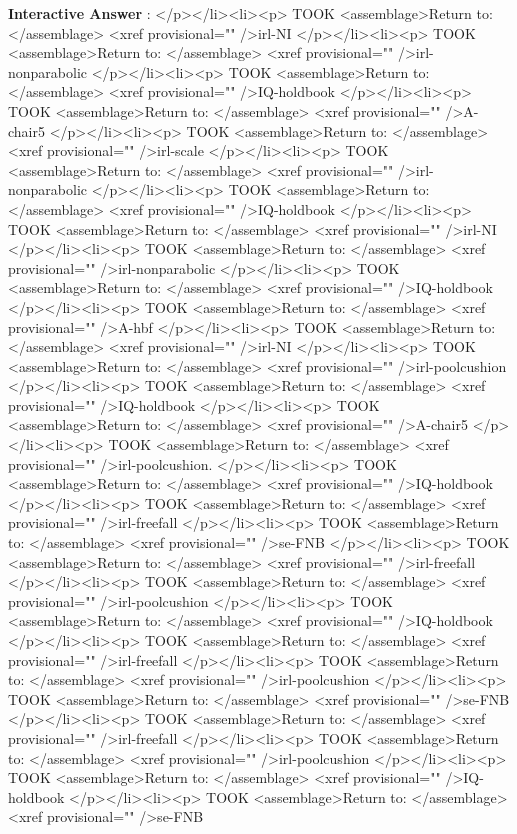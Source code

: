 \documentclass[11pt,letter,openany,makeidx]{book}
\newcounter{AtIQ}
\renewcommand{\theAtIQ}{Answer \arabic{AtIQ}}
\newenvironment{AIQ}{\begin{list}{\textbf{Interactive \theAtIQ}:}{\usecounter{AtIQ} \leftmargin 12pt}}{\end{list}}
\begin{document}
\begin{AIQ}
</p></li><li><p>\label{A-chair6} TOOK <assemblage>Return to: </assemblage> <xref provisional="" />{irl-NI}
</p></li><li><p>\label{A-fly.balls} TOOK <assemblage>Return to: </assemblage> <xref provisional="" />{irl-nonparabolic}
</p></li><li><p>\label{A-hitY} TOOK  <assemblage>Return to: </assemblage> <xref provisional="" />{IQ-holdbook}
</p></li><li><p>\label{A-noFT} TOOK <assemblage>Return to: </assemblage> <xref provisional="" />{A-chair5}
</p></li><li><p>\label{A-scale.ramp} TOOK   <assemblage>Return to: </assemblage> <xref provisional="" />{irl-scale}
</p></li><li><p>\label{A-pitches.side} TOOK  <assemblage>Return to: </assemblage> <xref provisional="" />{irl-nonparabolic}
</p></li><li><p>\label{A-hitN} TOOK <assemblage>Return to: </assemblage> <xref provisional="" />{IQ-holdbook}
</p></li><li><p>\label{A-chair7} TOOK <assemblage>Return to: </assemblage> <xref provisional="" />{irl-NI}
</p></li><li><p>\label{A-pitches.top} TOOK <assemblage>Return to: </assemblage> <xref provisional="" />{irl-nonparabolic}
</p></li><li><p>\label{A-landedY} TOOK  <assemblage>Return to: </assemblage> <xref provisional="" />{IQ-holdbook}
</p></li><li><p>\label{A-gravity}  TOOK <assemblage>Return to: </assemblage> <xref provisional="" />{A-hbf}
</p></li><li><p>\label{A-chair8} TOOK <assemblage>Return to: </assemblage> <xref provisional="" />{irl-NI}
</p></li><li><p>\label{A-pool-roll} TOOK <assemblage>Return to: </assemblage> <xref provisional="" />{irl-poolcushion}
</p></li><li><p>\label{A-landedN} TOOK <assemblage>Return to: </assemblage> <xref provisional="" />{IQ-holdbook}
</p></li><li><p>\label{A-FT} TOOK  <assemblage>Return to: </assemblage> <xref provisional="" />{A-chair5}
</p></li><li><p>\label{A-pool-bumper} TOOK <assemblage>Return to: </assemblage> <xref provisional="" />{irl-poolcushion}.
</p></li><li><p>\label{A-zero} TOOK <assemblage>Return to: </assemblage> <xref provisional="" />{IQ-holdbook}
</p></li><li><p>\label{A-firstfall} TOOK  <assemblage>Return to: </assemblage> <xref provisional="" />{irl-freefall}
</p></li><li><p>\label{A-floor}  TOOK  <assemblage>Return to: </assemblage> <xref provisional="" />{se-FNB}
</p></li><li><p>\label{A-firstwhy} TOOK  <assemblage>Return to: </assemblage> <xref provisional="" />{irl-freefall}
</p></li><li><p>\label{A-noncue} TOOK <assemblage>Return to: </assemblage> <xref provisional="" />{irl-poolcushion}
</p></li><li><p>\label{A-one} TOOK  <assemblage>Return to: </assemblage> <xref provisional="" />{IQ-holdbook}
</p></li><li><p>\label{A-fallv} TOOK  <assemblage>Return to: </assemblage> <xref provisional="" />{irl-freefall}
</p></li><li><p>\label{A-pool-spin} TOOK <assemblage>Return to: </assemblage> <xref provisional="" />{irl-poolcushion}
</p></li><li><p>\label{A-second} TOOK  <assemblage>Return to: </assemblage> <xref provisional="" />{se-FNB}
</p></li><li><p>\label{A-falla} TOOK  <assemblage>Return to: </assemblage> <xref provisional="" />{irl-freefall}
</p></li><li><p>\label{A-pool-later} TOOK <assemblage>Return to: </assemblage> <xref provisional="" />{irl-poolcushion}
</p></li><li><p>\label{A-two} TOOK  <assemblage>Return to: </assemblage> <xref provisional="" />{IQ-holdbook}
</p></li><li><p>\label{A-third} TOOK  <assemblage>Return to: </assemblage> <xref provisional="" />{se-FNB}


\end{AIQ}
\end{document}
